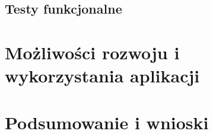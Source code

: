 \documentclass[12pt,a4paper,twoside]{article}
\begin{document}
\subsection{Testy funkcjonalne}
\section{Możliwości rozwoju i wykorzystania aplikacji}
\section*{Podsumowanie i wnioski}
\newpage
\listoffigures
{}


\end{document}
